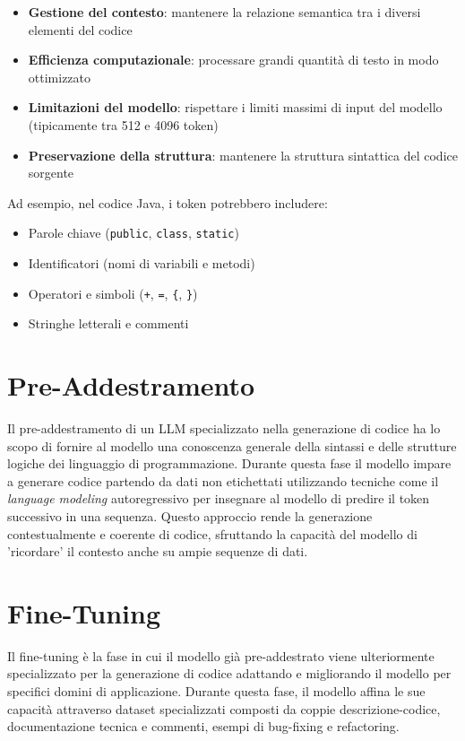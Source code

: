 \documentclass[12pt,a4paper,openright,twoside]{book}
\begin{document}
\begin{itemize}
    \item \textbf{Gestione del contesto}: mantenere la relazione semantica tra i diversi elementi del codice
    \item \textbf{Efficienza computazionale}: processare grandi quantità di testo in modo ottimizzato
    \item \textbf{Limitazioni del modello}: rispettare i limiti massimi di input del modello (tipicamente tra 512 e 4096 token)
    \item \textbf{Preservazione della struttura}: mantenere la struttura sintattica del codice sorgente
\end{itemize}

Ad esempio, nel codice Java, i token potrebbero includere:
\begin{itemize}
    \item Parole chiave (\texttt{public}, \texttt{class}, \texttt{static})
    \item Identificatori (nomi di variabili e metodi)
    \item Operatori e simboli (\texttt{+}, \texttt{=}, \texttt{\{}, \texttt{\}})
    \item Stringhe letterali e commenti
\end{itemize}
\section{Pre-Addestramento}
Il pre-addestramento di un LLM specializzato nella generazione di codice ha lo scopo di fornire al modello una conoscenza generale della sintassi e delle strutture logiche dei linguaggio di programmazione.
Durante questa fase il modello impare a generare codice partendo da dati non etichettati utilizzando tecniche come il \emph{language modeling} autoregressivo per insegnare al modello di predire il token successivo in una sequenza.
Questo approccio rende la generazione contestualmente e coerente di codice, sfruttando la capacità del modello di 'ricordare' il contesto anche su ampie sequenze di dati.
\section{Fine-Tuning}
Il fine-tuning è la fase in cui il modello già pre-addestrato viene ulteriormente specializzato per la generazione di codice adattando e migliorando il modello per specifici domini di applicazione.
Durante questa fase, il modello affina le sue capacità attraverso dataset specializzati composti da coppie descrizione-codice, documentazione tecnica e commenti, esempi di bug-fixing e refactoring.
\end{document}
